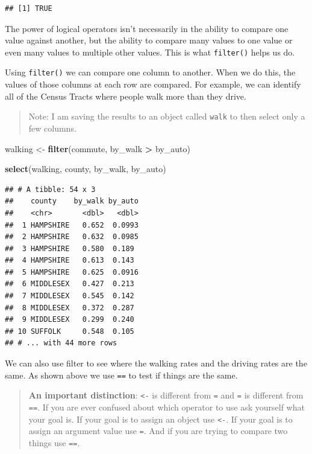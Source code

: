 \documentclass[
]{book}
\newenvironment{Shaded}{\begin{snugshade}}{\end{snugshade}}
\newcommand{\KeywordTok}[1]{\textcolor[rgb]{0.13,0.29,0.53}{\textbf{#1}}}
\newcommand{\NormalTok}[1]{#1}
\newcommand{\OperatorTok}[1]{\textcolor[rgb]{0.81,0.36,0.00}{\textbf{#1}}}
\newcommand{\StringTok}[1]{\textcolor[rgb]{0.31,0.60,0.02}{#1}}
\begin{document}
\begin{verbatim}
## [1] TRUE
\end{verbatim}

The power of logical operators isn't necessarily in the ability to compare one value against another, but the ability to compare many values to one value or even many values to multiple other values. This is what \texttt{filter()} helps us do.

Using \texttt{filter()} we can compare one column to another. When we do this, the values of those columns at each row are compared. For example, we can identify all of the Census Tracts where people walk more than they drive.

\begin{quote}
Note: I am saving the results to an object called \texttt{walk} to then select only a few columns.
\end{quote}

\begin{Shaded}
\begin{Highlighting}[]
\NormalTok{walking \textless{}{-}}\StringTok{ }\KeywordTok{filter}\NormalTok{(commute, by\_walk }\OperatorTok{\textgreater{}}\StringTok{ }\NormalTok{by\_auto)}

\KeywordTok{select}\NormalTok{(walking, county, by\_walk, by\_auto)}
\end{Highlighting}
\end{Shaded}

\begin{verbatim}
## # A tibble: 54 x 3
##    county    by_walk by_auto
##    <chr>       <dbl>   <dbl>
##  1 HAMPSHIRE   0.652  0.0993
##  2 HAMPSHIRE   0.632  0.0985
##  3 HAMPSHIRE   0.580  0.189 
##  4 HAMPSHIRE   0.613  0.143 
##  5 HAMPSHIRE   0.625  0.0916
##  6 MIDDLESEX   0.427  0.213 
##  7 MIDDLESEX   0.545  0.142 
##  8 MIDDLESEX   0.372  0.287 
##  9 MIDDLESEX   0.299  0.240 
## 10 SUFFOLK     0.548  0.105 
## # ... with 44 more rows
\end{verbatim}

We can also use filter to see where the walking rates and the driving rates are the same. As shown above we use \texttt{==} to test if things are the same.

\begin{quote}
\textbf{An important distinction}: \texttt{\textless{}-} is different from \texttt{=} and \texttt{=} is different from \texttt{==}. If you are ever confused about which operator to use ask yourself what your goal is. If your goal is to assign an object use \texttt{\textless{}-}. If your goal is to assign an argument value use \texttt{=}. And if you are trying to compare two things use \texttt{==}.
\end{quote}
\end{document}
